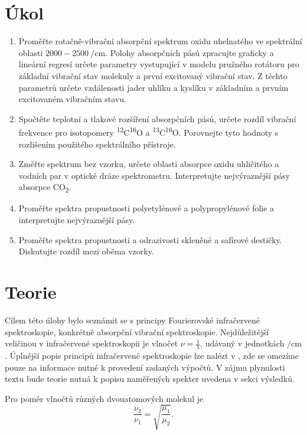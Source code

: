 \documentclass{protokol}
\begin{document}
  \section*{Úkol}

    \begin{enumerate}
      \item Proměřte rotačně-vibrační absorpční spektrum oxidu uhelnatého ve spektrální oblasti $2000 - \SI{2500}{\per\centi\metre}$. Polohy absorpčních pásů zpracujte graficky a lineární regresí určete parametry vystupující v modelu pružného rotátoru pro základní vibrační stav molekuly a první excitovaný vibrační stav. Z těchto parametrů určete vzdálenosti jader uhlíku a kyslíku v základním a prvním excitovaném vibračním stavu.
      \item Spočtěte teplotní a tlakové rozšíření absorpčních pásů, určete rozdíl vibrační frekvence pro isotopomery \textsuperscript{12}C\textsuperscript{16}O a \textsuperscript{13}C\textsuperscript{16}O. Porovnejte tyto hodnoty s rozlišením použitého spektrálního přístroje.
      \item Změřte spektrum bez vzorku, určete oblasti absorpce oxidu uhličitého a vodních par v optické dráze spektrometru. Interpretujte nejvýraznější pásy absorpce CO\textsubscript{2}.
      \item Proměřte spektra propustnosti polyetylénové a polypropylénové folie a interpretujte nejvýraznější pásy.
      \item Proměřte spektra propustnosti a odrazivosti skleněné a safírové destičky. Diskutujte rozdíl mezi oběma vzorky.
    \end{enumerate}

  \section*{Teorie}

    Cílem této úlohy bylo seznámit se s principy Fourierovské infračervené spektroskopie, konkrétně absorpční vibrační spektroskopie. Nejdůležitější veličinou v infračervené spektroskopii je vlnočet $\nu = \frac{1}{\lambda}$, udávaný v jednotkách $\si{\per\centi\metre}$. Úplnější popis principů infračervené spektroskopie lze nalézt v \cite{pokyny}, zde se omezíme pouze na informace nutné k provedení zadaných výpočtů. V zájmu plynulosti textu bude teorie nutná k popisu naměřených spekter uvedena v sekci výsledků.

    Pro poměr vlnočtů různých dvouatomových molekul je
    \begin{equation}
      \label{eq:isotopomer}
      \frac{\nu_2}{\nu_1} = \sqrt{\frac{\mu_1}{\mu_2}}.
    \end{equation}
\end{document}
